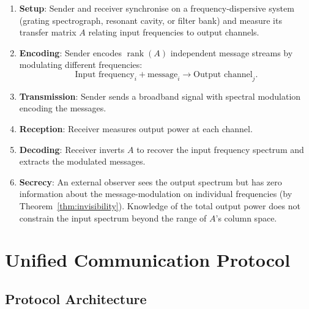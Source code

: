 \documentclass[11pt,twocolumn,a4paper]{article}
\theoremstyle{definition}
\DeclareMathOperator{\rank}{rank}
\begin{document}
\begin{protocol}
\label{prot:spectral}
\begin{enumerate}[nosep]
\item \textbf{Setup}: Sender and receiver synchronise on a frequency-dispersive system (grating spectrograph, resonant cavity, or filter bank) and measure its transfer matrix $A$ relating input frequencies to output channels.

\item \textbf{Encoding}: Sender encodes $\rank(A)$ independent message streams by modulating different frequencies:
\[
\text{Input frequency}_i + \text{message}_i \rightarrow \text{Output channel}_j.
\]

\item \textbf{Transmission}: Sender sends a broadband signal with spectral modulation encoding the messages.

\item \textbf{Reception}: Receiver measures output power at each channel.

\item \textbf{Decoding}: Receiver inverts $A$ to recover the input frequency spectrum and extracts the modulated messages.

\item \textbf{Secrecy}: An external observer sees the output spectrum but has zero information about the message-modulation on individual frequencies (by Theorem~\ref{thm:invisibility}). Knowledge of the total output power does not constrain the input spectrum beyond the range of $A$'s column space.
\end{enumerate}
\end{protocol}

\section{Unified Communication Protocol}
\label{sec:protocol}

\subsection{Protocol Architecture}
\end{document}
